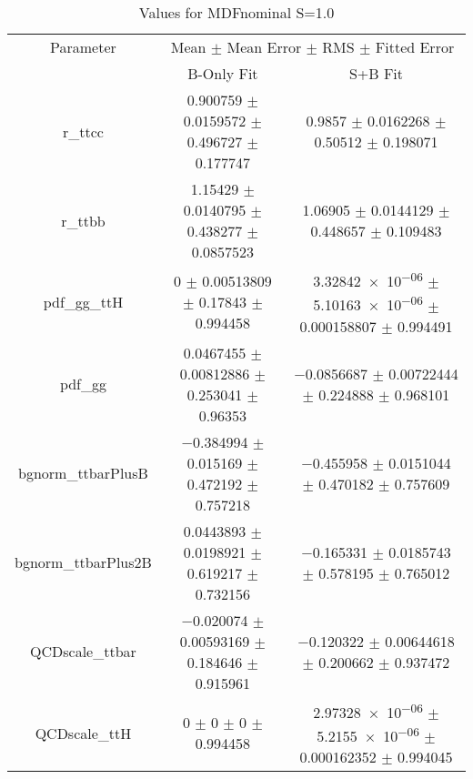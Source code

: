 \begin{table}
\centering
\caption{Values for MDFnominal S=1.0}
\begin{tabular}{ccc}
\toprule
Parameter & \multicolumn{2}{c}{Mean $\pm$ Mean Error $\pm$ RMS $\pm$ Fitted Error}\\
 & B-Only Fit & S+B Fit\\
\midrule
r\_ttcc & \num{0.900759} $\pm$ \num{0.0159572} $\pm$ \num{0.496727} $\pm$ \num{0.177747} & \num{0.9857} $\pm$ \num{0.0162268} $\pm$ \num{0.50512} $\pm$ \num{0.198071}\\
r\_ttbb & \num{1.15429} $\pm$ \num{0.0140795} $\pm$ \num{0.438277} $\pm$ \num{0.0857523} & \num{1.06905} $\pm$ \num{0.0144129} $\pm$ \num{0.448657} $\pm$ \num{0.109483}\\
pdf\_gg\_ttH & \num{0} $\pm$ \num{0.00513809} $\pm$ \num{0.17843} $\pm$ \num{0.994458} & \num{3.32842e-06} $\pm$ \num{5.10163e-06} $\pm$ \num{0.000158807} $\pm$ \num{0.994491}\\
pdf\_gg & \num{0.0467455} $\pm$ \num{0.00812886} $\pm$ \num{0.253041} $\pm$ \num{0.96353} & \num{-0.0856687} $\pm$ \num{0.00722444} $\pm$ \num{0.224888} $\pm$ \num{0.968101}\\
bgnorm\_ttbarPlusB & \num{-0.384994} $\pm$ \num{0.015169} $\pm$ \num{0.472192} $\pm$ \num{0.757218} & \num{-0.455958} $\pm$ \num{0.0151044} $\pm$ \num{0.470182} $\pm$ \num{0.757609}\\
bgnorm\_ttbarPlus2B & \num{0.0443893} $\pm$ \num{0.0198921} $\pm$ \num{0.619217} $\pm$ \num{0.732156} & \num{-0.165331} $\pm$ \num{0.0185743} $\pm$ \num{0.578195} $\pm$ \num{0.765012}\\
QCDscale\_ttbar & \num{-0.020074} $\pm$ \num{0.00593169} $\pm$ \num{0.184646} $\pm$ \num{0.915961} & \num{-0.120322} $\pm$ \num{0.00644618} $\pm$ \num{0.200662} $\pm$ \num{0.937472}\\
QCDscale\_ttH & \num{0} $\pm$ \num{0} $\pm$ \num{0} $\pm$ \num{0.994458} & \num{2.97328e-06} $\pm$ \num{5.2155e-06} $\pm$ \num{0.000162352} $\pm$ \num{0.994045}\\
\bottomrule
\end{tabular}
\end{table}